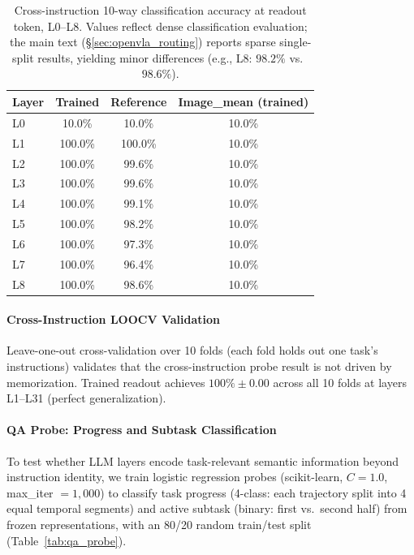 \begin{table}[h]
\centering
\caption{Cross-instruction 10-way classification accuracy at readout token, L0--L8. Values reflect dense classification evaluation; the main text (\S\ref{sec:openvla_routing}) reports sparse single-split results, yielding minor differences (e.g., L8: $98.2\%$ vs.\ $98.6\%$).}
\label{tab:dense_routing}
\small
\begin{tabular}{lccc}
\toprule
\textbf{Layer} & \textbf{Trained} & \textbf{Reference} & \textbf{Image\_mean (trained)} \\
\midrule
L0 & 10.0\% & 10.0\% & 10.0\% \\
L1 & 100.0\% & 100.0\% & 10.0\% \\
L2 & 100.0\% & 99.6\% & 10.0\% \\
L3 & 100.0\% & 99.6\% & 10.0\% \\
L4 & 100.0\% & 99.1\% & 10.0\% \\
L5 & 100.0\% & 98.2\% & 10.0\% \\
L6 & 100.0\% & 97.3\% & 10.0\% \\
L7 & 100.0\% & 96.4\% & 10.0\% \\
L8 & 100.0\% & 98.6\% & 10.0\% \\
\bottomrule
\end{tabular}
\end{table}

\paragraph{Cross-Instruction LOOCV Validation}
\label{sec:loocv}

Leave-one-out cross-validation over 10 folds (each fold holds out one task's instructions) validates that the cross-instruction probe result is not driven by memorization.
Trained readout achieves $100\% \pm 0.00$ across all 10 folds at layers L1--L31 (perfect generalization).

\paragraph{QA Probe: Progress and Subtask Classification}
To test whether LLM layers encode task-relevant semantic information beyond instruction identity, we train logistic regression probes (scikit-learn, $C = 1.0$, max\_iter $= 1{,}000$) to classify task progress (4-class: each trajectory split into 4 equal temporal segments) and active subtask (binary: first vs.\ second half) from frozen representations, with an 80/20 random train/test split (Table~\ref{tab:qa_probe}).

